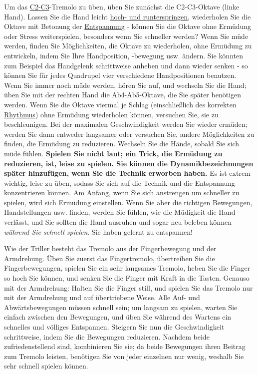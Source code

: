 Um das \hyperref[Noten]{C2-C3}-Tremolo zu üben, üben Sie zunächst die C2-C3-Oktave (linke Hand).
Lassen Sie die Hand leicht \hyperref[c1ii9]{hoch- und runterspringen}, wiederholen Sie die Oktave mit Betonung der \hyperref[c1ii14]{Entspannung} - können Sie die Oktave ohne Ermüdung oder Stress weiterspielen, besonders wenn Sie schneller werden?
Wenn Sie müde werden, finden Sie Möglichkeiten, die Oktave zu wiederholen, ohne Ermüdung zu entwickeln, indem Sie Ihre Handposition, -bewegung usw. ändern.
Sie könnten zum Beispiel das Handgelenk schrittweise anheben und dann wieder senken - so können Sie für jedes Quadrupel vier verschiedene Handpositionen benutzen.
Wenn Sie immer noch müde werden, hören Sie auf, und wechseln Sie die Hand; üben Sie mit der rechten Hand die Ab4-Ab5-Oktave, die Sie später benötigen werden.
Wenn Sie die Oktave viermal je Schlag (einschließlich des korrekten \hyperref[c1iii1b]{Rhythmus}) ohne Ermüdung wiederholen können, versuchen Sie, sie zu beschleunigen.
Bei der maximalen Geschwindigkeit werden Sie wieder ermüden; werden Sie dann entweder langsamer oder versuchen Sie, andere Möglichkeiten zu finden, die Ermüdung zu reduzieren.
Wechseln Sie die Hände, sobald Sie sich müde fühlen.
\textbf{Spielen Sie nicht laut; ein Trick, die Ermüdung zu reduzieren, ist, leise zu spielen.
Sie können die Dynamikbezeichnungen später hinzufügen, wenn Sie die Technik erworben haben.}
Es ist extrem wichtig, leise zu üben, sodass Sie sich auf die Technik und die Entspannung konzentrieren können.
Am Anfang, wenn Sie sich anstrengen um schneller zu spielen, wird sich Ermüdung einstellen.
Wenn Sie aber die richtigen Bewegungen, Handstellungen usw. finden, werden Sie fühlen, wie die Müdigkeit die Hand verlässt, und Sie sollten die Hand ausruhen und sogar neu beleben können \textit{während Sie schnell spielen}.
Sie haben gelernt zu entspannen!

Wie der Triller besteht das Tremolo aus der Fingerbewegung und der Armdrehung.
Üben Sie zuerst das Fingertremolo, übertreiben Sie die Fingerbewegungen, spielen Sie ein sehr langsames Tremolo, heben Sie die Finger so hoch Sie können, und senken Sie die Finger mit Kraft in die Tasten.
Genauso mit der Armdrehung: Halten Sie die Finger still, und spielen Sie das Tremolo nur mit der Armdrehung und auf übertriebene Weise.
Alle Auf- und Abwärtsbewegungen müssen schnell sein; um langsam zu spielen, warten Sie einfach zwischen den Bewegungen, und üben Sie während des Wartens ein schnelles und völliges Entspannen.
Steigern Sie nun die Geschwindigkeit schrittweise, indem Sie die Bewegungen reduzieren.
Nachdem beide zufriedenstellend sind, kombinieren Sie sie; da beide Bewegungen ihren Beitrag zum Tremolo leisten, benötigen Sie von jeder einzelnen nur wenig, weshalb Sie sehr schnell spielen können.

